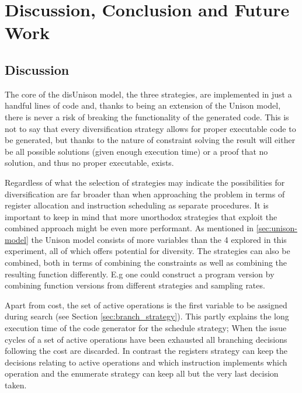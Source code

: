 \chapter{Discussion, Conclusion and Future Work}
\label{chapter:discussion}

\section{Discussion}
\label{sec:discussion}

The core of the disUnison model, the three strategies, are implemented in just a handful
lines of code and, thanks to being an extension of the Unison model, there is never a risk
of breaking the functionality of the generated code. This is not to say that every
diversification strategy allows for proper executable code to be generated, but thanks to
the nature of constraint solving the result will either be all possible solutions
(given enough execution time) or a proof that no solution, and thus no proper executable,
exists.

Regardless of what the selection of strategies may indicate the possibilities for
diversification are far broader than when approaching the problem in terms of register
allocation and instruction scheduling as separate procedures. It is important to keep in
mind that more unorthodox strategies that exploit the combined approach might be even
more performant. As mentioned in \ref{sec:unison-model} the Unison model consists of more
variables than the 4 explored in this experiment, all of which offers potential for
diversity. The strategies can also be combined, both in terms of combining the constraints
as well as combining the resulting function differently. E.g one could construct a program
version by combining function versions from different strategies and sampling rates.

Apart from cost, the set of active operations is the first variable to be assigned during
search (see Section \ref{sec:branch_strategy}). This partly explains the long execution
time of the code generator for the schedule strategy; When the issue cycles of a set of
active operations have been exhausted all branching decisions following the cost are
discarded. In contrast the registers strategy can keep the decisions relating to active
operations and which instruction implements which operation and the enumerate strategy can
keep all but the very last decision taken.

